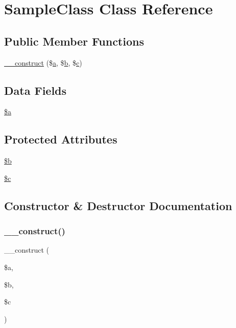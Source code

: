 \hypertarget{class_sample_class}{}\section{Sample\+Class Class Reference}
\label{class_sample_class}
\subsection*{Public Member Functions}
\begin{DoxyCompactItemize}
\item 
\mbox{\hyperlink{class_sample_class_a72cf3ec936279bc10099664c3d340871}{\+\_\+\+\_\+construct}} (\$\mbox{\hyperlink{interfacea}{a}}, \$\mbox{\hyperlink{interfaceb}{b}}, \$\mbox{\hyperlink{classc}{c}})
\end{DoxyCompactItemize}
\subsection*{Data Fields}
\begin{DoxyCompactItemize}
\item 
\mbox{\hyperlink{class_sample_class_acebf83966ef6d7e5645a6b62ba368f9f}{\$a}}
\end{DoxyCompactItemize}
\subsection*{Protected Attributes}
\begin{DoxyCompactItemize}
\item 
\mbox{\hyperlink{class_sample_class_ab9eb087b791749ae45deabb0899b7ccc}{\$b}}
\item 
\mbox{\hyperlink{class_sample_class_ab73d7f4f2dae233dd561e7fdaab3a77b}{\$c}}
\end{DoxyCompactItemize}


\subsection{Constructor \& Destructor Documentation}
\mbox{\label{class_sample_class_a72cf3ec936279bc10099664c3d340871}} 
\subsubsection{\texorpdfstring{\+\_\+\+\_\+construct()}{\_\_construct()}}
{\footnotesize\ttfamily \+\_\+\+\_\+construct (\begin{DoxyParamCaption}\item[{}]{\$a,  }\item[{}]{\$b,  }\item[{}]{\$c }\end{DoxyParamCaption})}



